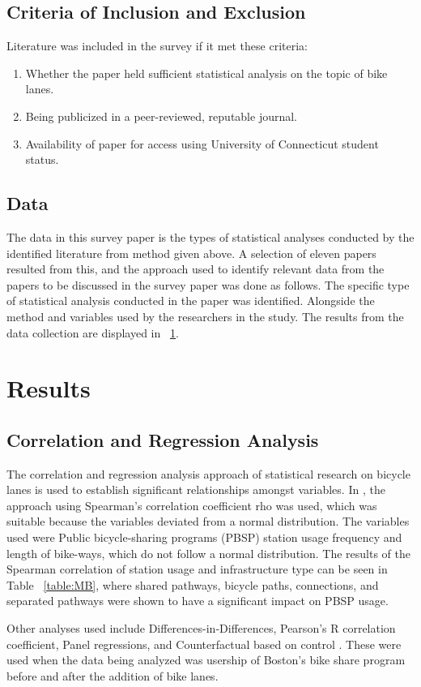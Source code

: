 \documentclass[12pt, letterpaper]{article}
\begin{document}
\subsection{Criteria of Inclusion and Exclusion}
\label{sec:inc}

Literature was included in the survey if it met these criteria:

\begin{enumerate}
        \item Whether the paper held sufficient statistical analysis on the topic of bike lanes. 
        \item Being publicized in a peer-reviewed, reputable journal.
        \item Availability of paper for access using University of Connecticut student status. 
\end{enumerate}

\subsection{Data}
\label{sec:data}

The data in this survey paper is the types of statistical analyses conducted by the identified literature from method given above. A selection of eleven papers resulted from this, and the approach used to identify relevant data from the papers to be discussed in the survey paper was done as follows. The specific type of statistical analysis conducted in the paper was identified. Alongside the method and variables used by the researchers in the study. The results from the data collection are displayed in ~\ref{sec:results}. 

\section{Results}
\label{sec:results}

\subsection{Correlation and Regression Analysis}
\label{sec:corr}

The correlation and regression analysis approach of statistical research on bicycle lanes is used to establish significant relationships amongst variables. In \citet{1MateoBabiano2016}, the approach using Spearman's correlation coefficient rho was used, which was suitable because the variables deviated from a normal distribution. The variables used were Public bicycle-sharing programs (PBSP) station usage frequency and length of bike-ways, which do not follow a normal distribution. The results of the Spearman correlation of station usage and infrastructure type can be seen in Table ~\ref{table:MB}, where shared pathways, bicycle paths, connections, and separated pathways were shown to have a significant impact on PBSP usage. \par
Other analyses used include Differences-in-Differences, Pearson's R correlation coefficient, Panel regressions, and Counterfactual based on control \cite{Karpinski2021}. These were used when the data being analyzed was usership of Boston's bike share program before and after the addition of bike lanes. 
\end{document}
